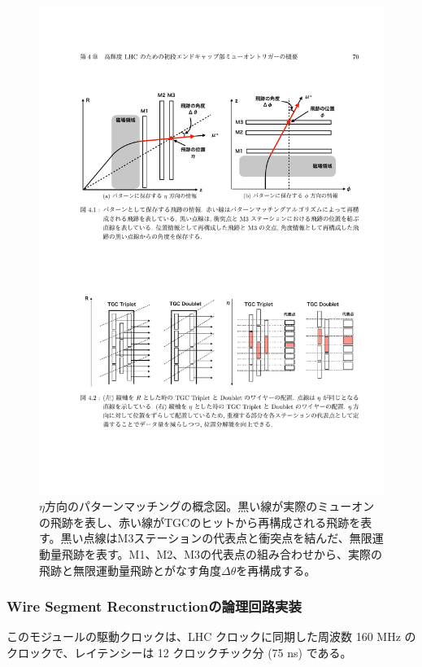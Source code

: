 \begin{figure} 
\centering
\includegraphics[width=16cm]{fig/SL/Concept_segment.pdf}
\caption[Segment Reconstructionのコンセプト]{$\eta$方向のパターンマッチングの概念図\cite{mt_mino}。黒い線が実際のミューオンの飛跡を表し、赤い線がTGCのヒットから再構成される飛跡を表す。黒い点線はM3ステーションの代表点と衝突点を結んだ、無限運動量飛跡を表す。M1、M2、M3の代表点の組み合わせから、実際の飛跡と無限運動量飛跡とがなす角度$\Delta\theta$を再構成する。}
\label{Concept_segment}
\end{figure}

\subsubsection*{Wire Segment Reconstructionの論理回路実装}
このモジュールの駆動クロックは、LHC クロックに同期した周波数 160 MHz のクロックで、レイテンシーは 12 クロックチック分 (75 ns) である。

